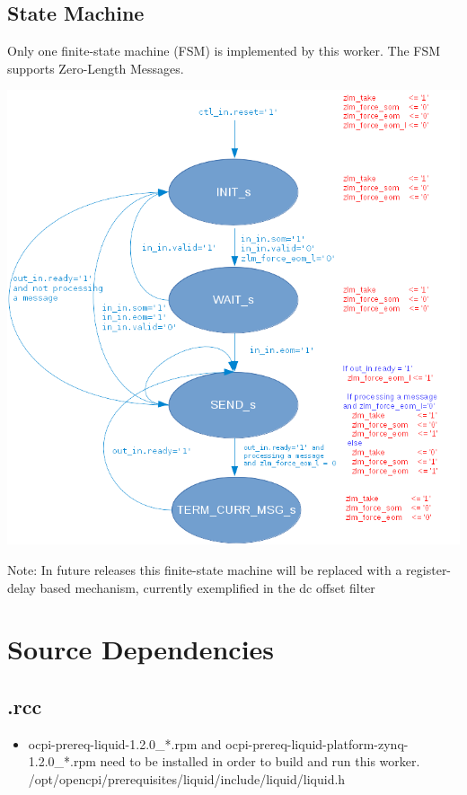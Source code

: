 \subsection*{State Machine}
	\begin{flushleft}
		Only one finite-state machine (FSM) is implemented by this worker. The FSM supports Zero-Length Messages.
	\end{flushleft}
	{\centering\captionsetup{type=figure}\includegraphics[scale=0.45]{complex_mixer_zlm_fsm}
	\label{fig:zlm_fsm}}
        \begin{flushleft}
                Note: In future releases this finite-state machine will be replaced with a register-delay based mechanism, currently exemplified in the dc offset filter
        \end{flushleft}

\newpage
\section*{Source Dependencies}
\subsection*{\comp.rcc}
\begin{itemize}
   \item ocpi-prereq-liquid-1.2.0\_*.rpm and 	ocpi-prereq-liquid-platform-zynq-1.2.0\_*.rpm need to be installed in order to build and run this worker.
   \subitem /opt/opencpi/prerequisites/liquid/include/liquid/liquid.h
\end{itemize}
